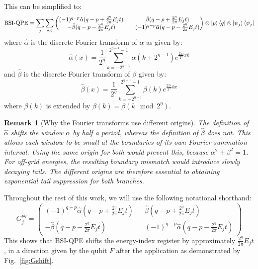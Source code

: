 \documentclass[aps,floatfix,10pt,amssymb,amsfont,amsmath,superscriptaddress,float,nofootinbib,longbibliography,nobalancelastpage,twocolumn]{revtex4-2}
\newtheorem{remark}{Remark}
\begin{document}
\begin{widetext}
This can be simplified to:
\begin{equation}
    \text{BSI-QPE} = \sum_j\sum_{p,q} \begin{pmatrix}
        (-1)^{q-p}\hat\alpha(q-p+\frac{2^{\eta}}{2\pi}E_jt) && \hat\beta(q-p+\frac{2^{\eta}}{2\pi}E_jt)\\
        -\hat\beta (q-p-\frac{2^{\eta}}{2\pi}E_jt) && (-1)^{q-p}\hat\alpha(q-p-\frac{2^{\eta}}{2\pi}E_jt)
    \end{pmatrix}\otimes\ket{p}\bra{q}\otimes\ket{\psi_j}\bra{\psi_j}
\end{equation}
where $\hat \alpha$ is the discrete Fourier transform of $\alpha$ as given by:
\begin{equation}
   \hat\alpha(x) =\frac{1}{2^{\eta}}\sum_{k=-2^{\eta-1}}^{2^{\eta-1}-1} \alpha(k+2^{\eta-1})e^{\frac{2\pi i}{2^{\eta}}xk}
\end{equation}
and $\hat \beta$ is the discrete Fourier transform of $\beta$ given by:
\begin{equation}
    \hat\beta(x) =\frac{1}{2^{\eta}}\sum_{k=-2^{\eta-1}}^{2^{\eta-1}-1} \beta(k)e^{\frac{2\pi i}{2^{\eta}}kx}
\end{equation}
 where $\beta(k)$ is extended by $\beta(k) = \beta(k \mod 2^{\eta})$. 
 \begin{remark}[Why the Fourier transforms use different origins]
     The definition of $\hat\alpha$ shifts the window $\alpha$ by half a period, whereas the definition of $\hat\beta$ does not. This allows each window to be small at the boundaries of its own Fourier summation interval. Using the same origin for both would prevent this, because $\alpha^2+\beta^2=1$. For off-grid energies, the resulting boundary mismatch would introduce slowly decaying tails. The different origins are therefore essential to obtaining exponential tail suppression for both branches.
 \end{remark}
Throughout the rest of this work, we will use the following notational shorthand: 
\begin{equation}
    G_j^{pq} = \begin{pmatrix}
        (-1)^{q-p}\hat\alpha(q-p+\frac{2^{\eta}}{2\pi}E_jt) && \hat\beta(q-p+\frac{2^{\eta}}{2\pi}E_jt)\\
        -\hat\beta (q-p-\frac{2^{\eta}}{2\pi}E_jt) && (-1)^{q-p}\hat\alpha(q-p-\frac{2^{\eta}}{2\pi}E_jt)
    \end{pmatrix}
\end{equation}
This shows that BSI-QPE shifts the energy-index register by approximately $\frac{2^{\eta}}{2\pi}E_jt$, in a direction given by the qubit $F$ after the application as demonstrated by Fig.~\ref{fig:Gshift}. 

\end{widetext}
\end{document}
